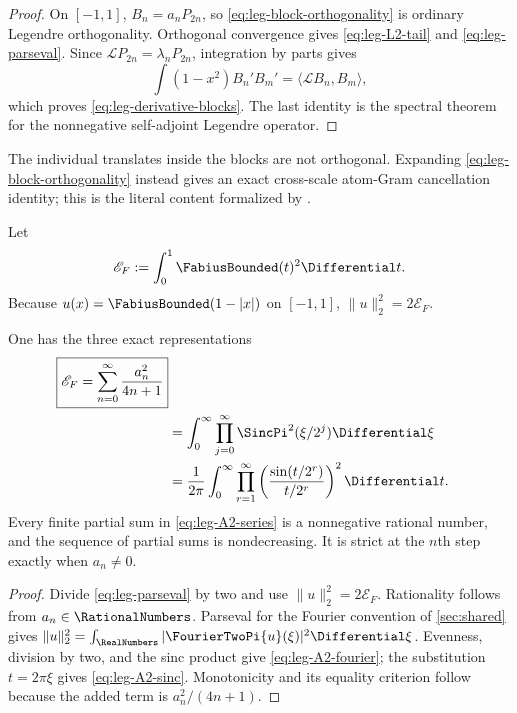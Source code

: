 \begin{proof}
On $[-1,1]$, $B_n=a_nP_{2n}$, so
\eqref{eq:leg-block-orthogonality} is ordinary Legendre orthogonality.
Orthogonal convergence gives \eqref{eq:leg-L2-tail} and
\eqref{eq:leg-parseval}.  Since
$\mathcal LP_{2n}=\lambda_nP_{2n}$, integration by parts gives
\[
 \int(1-x^2)B_n'B_m'=\langle\mathcal LB_n,B_m\rangle,
\]
which proves \eqref{eq:leg-derivative-blocks}.  The last identity is the
spectral theorem for the nonnegative self-adjoint Legendre operator.
\end{proof}

The individual translates inside the blocks are not orthogonal.  Expanding
\eqref{eq:leg-block-orthogonality} instead gives an exact cross-scale
atom-Gram cancellation identity; this is the literal content formalized by
.

Let
\begin{equation}
 \mathscr E_F:=\int_0^1\FabiusBounded(t)^2\Differential t.
 \label{eq:leg-A2}
\end{equation}
Because $u(x)=\FabiusBounded(1-|x|)$ on $[-1,1]$, $\|u\|_2^2=2\mathscr E_F$.

\begin{theorem}
\label{thm:leg-A2}
One has the three exact representations
\begin{align}
 \boxed{\mathscr E_F=\sum_{n=0}^{\infty}\frac{a_n^2}{4n+1}}
 \label{eq:leg-A2-series}\\
 &=\int_0^\infty
 \prod_{j=0}^{\infty}\SincPi^2(\xi/2^j)\Differential\xi
 \label{eq:leg-A2-fourier}\\
 &=\frac1{2\pi}\int_0^\infty
 \prod_{r=1}^{\infty}
 \left(\frac{\sin(t/2^r)}{t/2^r}\right)^2\Differential t.
 \label{eq:leg-A2-sinc}
\end{align}
Every finite partial sum in \eqref{eq:leg-A2-series} is a nonnegative
rational number, and the sequence of partial sums is nondecreasing.  It is
strict at the $n$th step exactly when $a_n\ne0$.
\end{theorem}

\begin{proof}
Divide \eqref{eq:leg-parseval} by two and use
$\|u\|_2^2=2\mathscr E_F$.  Rationality follows from $a_n\in\RationalNumbers$.
Parseval for the Fourier convention of \cref{sec:shared} gives
$\|u\|_2^2=\int_\RealNumbers|\FourierTwoPi{u}(\xi)|^2\Differential\xi$.  Evenness, division by two,
and the sinc product give \eqref{eq:leg-A2-fourier}; the substitution
$t=2\pi\xi$ gives \eqref{eq:leg-A2-sinc}.  Monotonicity and its equality
criterion follow because the added term is $a_n^2/(4n+1)$.
\end{proof}

